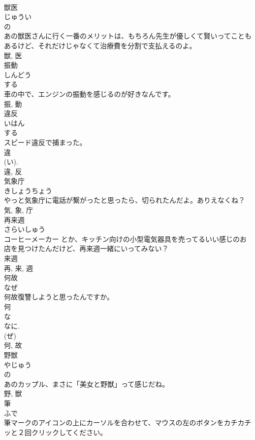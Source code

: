 \documentclass[8pt]{extreport}
\begin{document}
\begin{CJK}{UTF8}{min}
\\	獣医	
\\	じゅうい	
\\	の 
\\	あの獣医さんに行く一番のメリットは、もちろん先生が優しくて賢いってこともあるけど、それだけじゃなくて治療費を分割で支払えるのよ。	
\\	獣, 医	
\\	振動	
\\	しんどう	
\\	する 
\\	車の中で、エンジンの振動を感じるのが好きなんです。	
\\	振, 動	
\\	違反	
\\	いはん	
\\	する 
\\	スピード違反で捕まった。	
\\	違 
\\	(い). 
\\	違, 反	
\\	気象庁	
\\	きしょうちょう	
\\	やっと気象庁に電話が繋がったと思ったら、切られたんだよ。ありえなくね？	
\\	気, 象, 庁	
\\	再来週	
\\	さらいしゅう	
\\	コーヒーメーカー とか、キッチン向けの小型電気器具を売ってるいい感じのお店を見つけたんだけど、再来週一緒にいってみない？	
\\	来週 
\\	再, 来, 週	
\\	何故	
\\	なぜ	
\\	何故復讐しようと思ったんですか。	
\\	何 
\\	な 
\\	なに. 
\\	(ぜ) 
\\	何, 故	
\\	野獣	
\\	やじゅう	
\\	の 
\\	あのカップル、まさに「美女と野獣」って感じだね。	
\\	野, 獣	
\\	筆	
\\	ふで	
\\	筆マークのアイコンの上にカーソルを合わせて、マウスの左のボタンをカチカチッと２回クリックしてください。	

\end{CJK}
\end{document}
